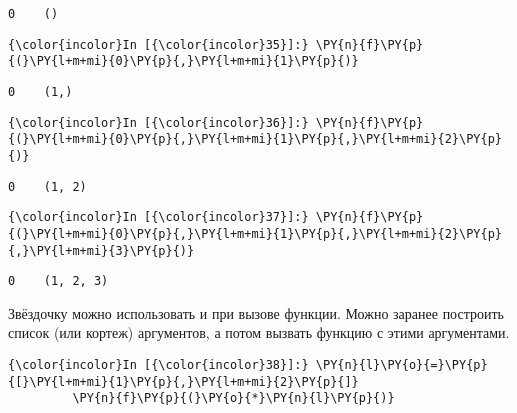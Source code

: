    \begin{Verbatim}[commandchars=\\\{\}]
0    ()

    \end{Verbatim}

    \begin{Verbatim}[commandchars=\\\{\}]
{\color{incolor}In [{\color{incolor}35}]:} \PY{n}{f}\PY{p}{(}\PY{l+m+mi}{0}\PY{p}{,}\PY{l+m+mi}{1}\PY{p}{)}
\end{Verbatim}

    \begin{Verbatim}[commandchars=\\\{\}]
0    (1,)

    \end{Verbatim}

    \begin{Verbatim}[commandchars=\\\{\}]
{\color{incolor}In [{\color{incolor}36}]:} \PY{n}{f}\PY{p}{(}\PY{l+m+mi}{0}\PY{p}{,}\PY{l+m+mi}{1}\PY{p}{,}\PY{l+m+mi}{2}\PY{p}{)}
\end{Verbatim}

    \begin{Verbatim}[commandchars=\\\{\}]
0    (1, 2)

    \end{Verbatim}

    \begin{Verbatim}[commandchars=\\\{\}]
{\color{incolor}In [{\color{incolor}37}]:} \PY{n}{f}\PY{p}{(}\PY{l+m+mi}{0}\PY{p}{,}\PY{l+m+mi}{1}\PY{p}{,}\PY{l+m+mi}{2}\PY{p}{,}\PY{l+m+mi}{3}\PY{p}{)}
\end{Verbatim}

    \begin{Verbatim}[commandchars=\\\{\}]
0    (1, 2, 3)

    \end{Verbatim}

    Звёздочку можно использовать и при вызове функции. Можно заранее
построить список (или кортеж) аргументов, а потом вызвать функцию с
этими аргументами.

    \begin{Verbatim}[commandchars=\\\{\}]
{\color{incolor}In [{\color{incolor}38}]:} \PY{n}{l}\PY{o}{=}\PY{p}{[}\PY{l+m+mi}{1}\PY{p}{,}\PY{l+m+mi}{2}\PY{p}{]}
         \PY{n}{f}\PY{p}{(}\PY{o}{*}\PY{n}{l}\PY{p}{)}
\end{Verbatim}

